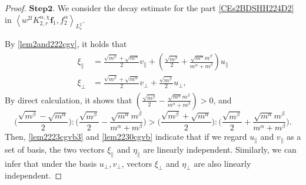 \documentclass[reqno]{amsart}
\numberwithin{equation}{section}
\numberwithin{equation}{section}
\begin{document}
\begin{proof}
		
		$\mathbf{Step 2}$. We consider the decay estimate for the part \eqref{CEs2BDSHH224D2} in $\left \langle  w^{2l}K_{2,r}^{\alpha,\chi}\mathbf{f}_1,f^{\alpha}_2\right \rangle_{L^{2}_{v}}$.
		
		By \eqref{lem2and222cgv}, it holds that
		\begin{eqnarray}\label{lem2230cgvb}
			\begin{split}
				\xi_{\parallel} &= \frac{\sqrt{m^\beta}+\sqrt{m^\alpha}}{2}v_{\parallel} + (\frac{\sqrt{m^\beta}}{2}+\frac{\sqrt{m^{\alpha}}m^{\beta}}{m^{\alpha}+m^{\beta}})u_{\parallel} \\
				\xi_{\perp} &= \frac{\sqrt{m^\beta}+\sqrt{m^\alpha}}{2}v_{\perp} +\frac{\sqrt{m^\beta}}{2}u_{\perp},
			\end{split}
		\end{eqnarray}
		By direct calculation, it shows that  $(\frac{\sqrt{m^\beta}}{2}-\frac{\sqrt{m^{\alpha}}m^{\beta}}{m^{\alpha}+m^{\beta}})>0$, and 
		\begin{equation}\label{CET2PARALCOMPAR}
			\big(\frac{\sqrt{m^\beta}-\sqrt{m^\alpha}}{2}\big):\big(\frac{\sqrt{m^\beta}}{2}-\frac{\sqrt{m^{\alpha}}m^{\beta}}{m^{\alpha}+m^{\beta}}\big)>\big(\frac{\sqrt{m^\beta}+\sqrt{m^\alpha}}{2}\big):\big(\frac{\sqrt{m^\beta}}{2}+\frac{\sqrt{m^{\alpha}}m^{\beta}}{m^{\alpha}+m^{\beta}}\big).
		\end{equation}
		Then, \eqref{lem2223cgvb3} and \eqref{lem2230cgvb} indicate that if we regard $u_{\parallel}$ and $v_{\parallel}$ as a set of basis, the two vectors $\xi_{\parallel}$ and $\eta_{\parallel}$ are linearly independent. Similarly, we can infer that under the basis $u_{\perp},v_{\perp}$, vectors $\xi_{\perp}$ and $\eta_{\perp}$ are also linearly independent. 
		

\end{proof}
\end{document}
